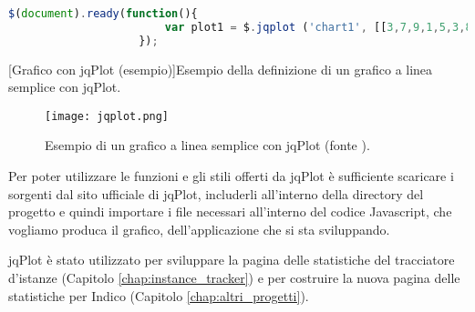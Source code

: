             \begin{center}
                \begin{lstlisting}[language=javascript, gobble=18]
                    $(document).ready(function(){
                        var plot1 = $.jqplot ('chart1', [[3,7,9,1,5,3,8,2,5]]);
                    });
                \end{lstlisting}
                \captionsetup{textformat=empty,labelformat=empty} \vspace{-2em}
                [Grafico con jqPlot (esempio)]{Esempio della definizione di un grafico a linea semplice con jqPlot.}
            \end{center}
            
        	\begin{figure}[h!]
        		\begin{center}
        			\texttt{[image: jqplot.png]}
        		\end{center}
        		\caption[Grafico con jqPlot (esempio)]{Esempio di un grafico a linea semplice con jqPlot (fonte \cite{jqplot:examples}).}
        		\label{fig:jqplot}
        	\end{figure}
        	
        	Per poter utilizzare le funzioni e gli stili offerti da jqPlot è sufficiente scaricare i sorgenti dal sito ufficiale di jqPlot, includerli all'interno della directory del progetto e quindi importare i file necessari all'interno del codice Javascript, che vogliamo produca il grafico, dell'applicazione che si sta sviluppando.
        	
        	jqPlot è stato utilizzato per sviluppare la pagina delle statistiche del tracciatore d'istanze (Capitolo \ref{chap:instance_tracker}) e per costruire la nuova pagina delle statistiche per Indico (Capitolo \ref{chap:altri_progetti}).
